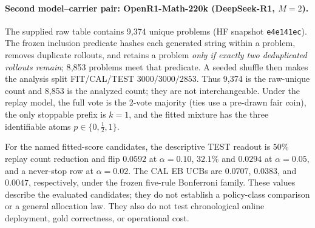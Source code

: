 \documentclass{article}
\theoremstyle{definition}
\theoremstyle{remark}
\begin{document}
\paragraph{Second model--carrier pair: OpenR1-Math-220k (DeepSeek-R1, $M=2$).}
The supplied raw table contains 9{,}374 unique problems (HF snapshot
\texttt{e4e141ec}). The frozen inclusion predicate hashes each generated
string within a problem, removes duplicate rollouts, and retains a problem
\emph{only if exactly two deduplicated rollouts remain}; 8{,}853 problems meet
that predicate. A seeded shuffle then makes the analysis split FIT/CAL/TEST
$3000/3000/2853$. Thus 9{,}374 is the raw-unique count and 8{,}853 is the
analyzed count; they are not interchangeable. Under the replay model, the
full vote is the 2-vote majority (ties use a pre-drawn fair coin), the only
stoppable prefix is $k=1$, and the fitted mixture has the three identifiable
atoms $p\in\{0,\tfrac12,1\}$.

For the named fitted-score candidates, the descriptive TEST readout is $50\%$
replay count reduction and flip $0.0592$ at $\alpha=0.10$, $32.1\%$ and
$0.0294$ at $\alpha=0.05$, and a never-stop row at $\alpha=0.02$. The CAL EB
UCBs are $0.0707$, $0.0383$, and $0.0047$, respectively, under the frozen
five-rule Bonferroni family. These values describe the evaluated candidates;
they do not establish a policy-class comparison or a general allocation law.
They also do not test chronological online
deployment, gold correctness, or operational cost.
\end{document}
